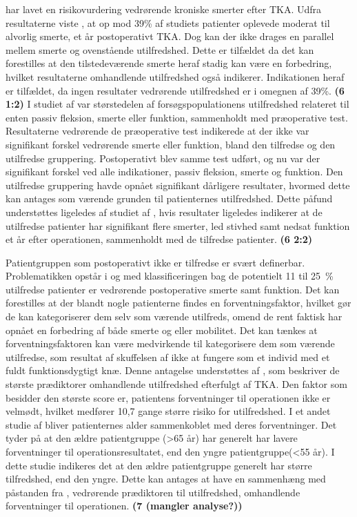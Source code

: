\cite{Sakellariou2016} har lavet en risikovurdering vedrørende kroniske smerter efter TKA. Udfra resultaterne viste \cite{Sakellariou2016}, at op mod 39\% af studiets patienter oplevede moderat til alvorlig smerte, et år postoperativt TKA. Dog kan der ikke drages en parallel mellem smerte og ovenstående utilfredshed. Dette er tilfældet da det kan forestilles at den tilstedeværende smerte heraf stadig kan være en forbedring, hvilket resultaterne omhandlende utilfredshed også indikerer. Indikationen heraf er tilfældet, da ingen resultater vedrørende utilfredshed er i omegnen af 39\%.  \textbf{(6 1:2)} \citep{Sakellariou2016} I studiet af \cite{Jacobs2014} var størstedelen af forsøgspopulationens utilfredshed relateret til enten passiv fleksion, smerte eller funktion, sammenholdt med præoperative test. Resultaterne vedrørende de præoperative test indikerede at der ikke var signifikant forskel vedrørende smerte eller funktion, bland den tilfredse og den utilfredse gruppering. Postoperativt blev samme test udført, og nu var der signifikant forskel ved alle indikationer, passiv fleksion, smerte og funktion. Den utilfredse gruppering havde opnået signifikant dårligere resultater, hvormed dette kan antages som værende grunden til patienternes utilfredshed. \citep{Jacobs2014} Dette påfund understøttes ligeledes af studiet af \cite{Bourne2010}, hvis resultater ligeledes indikerer at de utilfredse patienter har signifikant flere smerter, led stivhed samt nedsat funktion et år efter operationen, sammenholdt med de tilfredse patienter. \citep{Bourne2010} \textbf{(6 2:2)}  

Patientgruppen som postoperativt ikke er tilfredse er svært definerbar. Problematikken opstår i og med klassificeringen bag de potentielt 11 til 25~\% utilfredse patienter er vedrørende postoperative smerte samt funktion. Det kan forestilles at der blandt nogle patienterne findes en forventningsfaktor, hvilket gør de kan kategoriserer dem selv som værende utilfreds, omend de rent faktisk har opnået en forbedring af både smerte og eller mobilitet. Det kan tænkes at forventningsfaktoren kan være medvirkende til kategorisere dem som værende utilfredse, som resultat af skuffelsen af ikke at fungere som et individ med et fuldt funktionsdygtigt knæ. Denne antagelse understøttes af \cite{Bourne2010}, som beskriver de største prædiktorer omhandlende utilfredshed efterfulgt af TKA. Den faktor som besidder den største score er,  patientens forventninger til operationen ikke er velmødt, hvilket medfører 10,7 gange større risiko for utilfredshed. \citep{Bourne2010} I et andet studie af \cite{Keudell2013} bliver patienternes alder sammenkoblet med deres forventninger. Det tyder på at den ældre patientgruppe (>65 år) har generelt har lavere forventninger til operationsresultatet, end den yngre patientgruppe(<55 år). I dette studie indikeres det at den ældre patientgruppe generelt har større tilfredshed, end den yngre. Dette kan antages at have en sammenhæng med påstanden fra \cite{Bourne2010}, vedrørende prædiktoren til utilfredshed, omhandlende forventninger til operationen. \textbf{(7 (mangler analyse?))}

